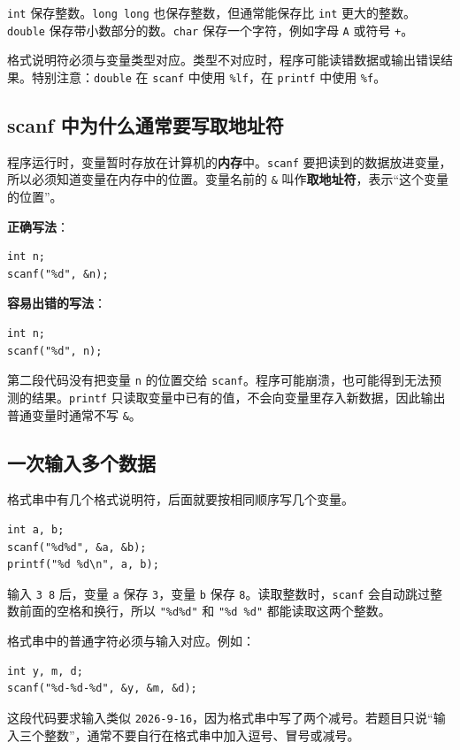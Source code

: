 \documentclass[UTF8,zihao=-4,fontset=windows]{ctexart}
\newcommand{\term}[1]{\textbf{\color{navy}#1}}
\newcommand{\good}{\textbf{\color{green}正确写法}}
\newcommand{\bad}{\textbf{\color{red}容易出错的写法}}
\begin{document}
\verb|int| 保存整数。\verb|long long| 也保存整数，但通常能保存比 \verb|int| 更大的整数。\verb|double| 保存带小数部分的数。\verb|char| 保存一个字符，例如字母 \verb|A| 或符号 \verb|+|。

格式说明符必须与变量类型对应。类型不对应时，程序可能读错数据或输出错误结果。特别注意：\verb|double| 在 \verb|scanf| 中使用 \verb|%lf|，在 \verb|printf| 中使用 \verb|%f|。

\subsection{scanf 中为什么通常要写取地址符}

程序运行时，变量暂时存放在计算机的\term{内存}中。\verb|scanf| 要把读到的数据放进变量，所以必须知道变量在内存中的位置。变量名前的 \verb|&| 叫作\term{取地址符}，表示“这个变量的位置”。

\good：
\begin{lstlisting}[style=cstyle]
int n;
scanf("%d", &n);
\end{lstlisting}

\bad：
\begin{lstlisting}[style=cstyle]
int n;
scanf("%d", n);
\end{lstlisting}

第二段代码没有把变量 \verb|n| 的位置交给 \verb|scanf|。程序可能崩溃，也可能得到无法预测的结果。\verb|printf| 只读取变量中已有的值，不会向变量里存入新数据，因此输出普通变量时通常不写 \verb|&|。

\subsection{一次输入多个数据}

格式串中有几个格式说明符，后面就要按相同顺序写几个变量。

\begin{lstlisting}[style=cstyle]
int a, b;
scanf("%d%d", &a, &b);
printf("%d %d\n", a, b);
\end{lstlisting}

输入 \verb|3 8| 后，变量 \verb|a| 保存 \verb|3|，变量 \verb|b| 保存 \verb|8|。读取整数时，\verb|scanf| 会自动跳过整数前面的空格和换行，所以 \verb|"%d%d"| 和 \verb|"%d %d"| 都能读取这两个整数。

格式串中的普通字符必须与输入对应。例如：
\begin{lstlisting}[style=cstyle]
int y, m, d;
scanf("%d-%d-%d", &y, &m, &d);
\end{lstlisting}

这段代码要求输入类似 \verb|2026-9-16|，因为格式串中写了两个减号。若题目只说“输入三个整数”，通常不要自行在格式串中加入逗号、冒号或减号。
\end{document}
